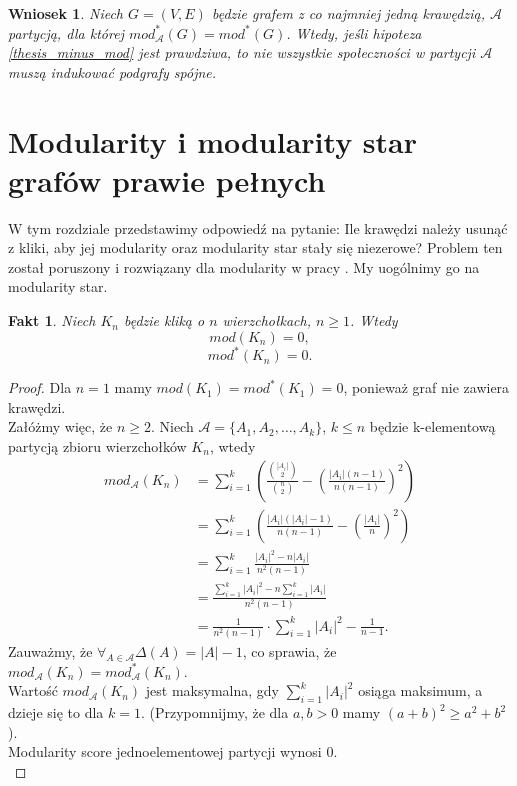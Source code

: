\documentclass[letterpaper,12pt]{article}
\newtheorem{fact}{Fakt}
\newtheorem{conclusion}{Wniosek}
\begin{document}
\begin{conclusion}
  Niech \(G = (V,E)\) będzie grafem z co najmniej jedną krawędzią, \(\mathcal{A}\) partycją, dla której \(mod_{\mathcal{A}}^*(G) = mod^*(G)\). Wtedy, jeśli hipoteza \ref{thesis_minus_mod} jest prawdziwa, to nie wszystkie społeczności w partycji \(\mathcal{A}\) muszą indukować podgrafy spójne.\\
\end{conclusion}

\section{Modularity i modularity star grafów prawie pełnych}
W tym rozdziale przedstawimy odpowiedź na pytanie: Ile krawędzi należy usunąć z kliki, aby jej modularity oraz modularity star stały się niezerowe? Problem ten został poruszony i rozwiązany dla modularity w pracy \cite{MS23}. My uogólnimy go na modularity star.\\
\begin{fact}
  \label{clique_mod}
  Niech \(K_n\) będzie kliką o \(n\) wierzchołkach, \(n \geq 1\). Wtedy
  \[mod(K_n) = 0,\]
  \[mod^*(K_n) = 0.\]
\end{fact}

\begin{proof}
  Dla \(n=1\) mamy \(mod(K_1) = mod^*(K_1) = 0\), ponieważ graf nie zawiera krawędzi.\\
  Załóżmy więc, że \(n \geq 2\). Niech \(\mathcal{A} = \{A_1, A_2, \ldots, A_k\}\), \(k \leq n\) będzie k-elementową partycją zbioru wierzchołków \(K_n\), wtedy
  \begin{align*}
    mod_{\mathcal{A}}(K_n) & = \sum_{i=1}^k \left(\frac{\binom{|A_i|}{2}}{\binom{n}{2}} - {\left(\frac{|A_i|(n-1)}{n(n-1)}\right)}^2\right) \\
                           & = \sum_{i=1}^k \left(\frac{|A_i|(|A_i|-1)}{n(n-1)} - {\left(\frac{|A_i|}{n}\right)}^2\right)                   \\
                           & = \sum_{i=1}^k \frac{|A_i|^2 - n|A_i|}{n^2(n-1)}                                                               \\
                           & = \frac{\sum_{i=1}^k |A_i|^2 - n\sum_{i=1}^k |A_i|}{n^2(n-1)}                                                  \\
                           & = \frac{1}{n^2(n-1)} \cdot \sum_{i=1}^k |A_i|^2 - \frac{1}{n-1}.
  \end{align*}
  Zauważmy, że \(\forall_{A \in \mathcal{A}} \Delta(A) = |A| - 1\), co sprawia, że \(mod_{\mathcal{A}}(K_n) = mod_{\mathcal{A}}^*(K_n)\).\\
  Wartość \(mod_{\mathcal{A}}(K_n)\) jest maksymalna, gdy \(\sum_{i=1}^k |A_i|^2\) osiąga maksimum, a dzieje się to dla \(k=1\). (Przypomnijmy, że dla \(a,b>0\) mamy \((a+b)^2 \geq a^2 + b^2\)).\\

  Modularity score jednoelementowej partycji wynosi 0.\\
\end{proof}
\end{document}
